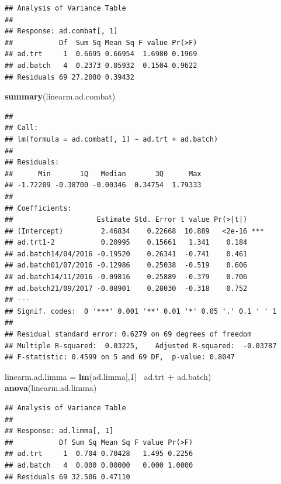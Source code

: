 \documentclass[]{book}
\newenvironment{Shaded}{\begin{snugshade}}{\end{snugshade}}
\newcommand{\KeywordTok}[1]{\textcolor[rgb]{0.13,0.29,0.53}{\textbf{#1}}}
\newcommand{\DecValTok}[1]{\textcolor[rgb]{0.00,0.00,0.81}{#1}}
\newcommand{\StringTok}[1]{\textcolor[rgb]{0.31,0.60,0.02}{#1}}
\newcommand{\OperatorTok}[1]{\textcolor[rgb]{0.81,0.36,0.00}{\textbf{#1}}}
\newcommand{\NormalTok}[1]{#1}
\begin{document}
\begin{verbatim}
## Analysis of Variance Table
## 
## Response: ad.combat[, 1]
##           Df  Sum Sq Mean Sq F value Pr(>F)
## ad.trt     1  0.6695 0.66954  1.6980 0.1969
## ad.batch   4  0.2373 0.05932  0.1504 0.9622
## Residuals 69 27.2080 0.39432
\end{verbatim}

\begin{Shaded}
\begin{Highlighting}[]
\KeywordTok{summary}\NormalTok{(linearm.ad.combat)}
\end{Highlighting}
\end{Shaded}

\begin{verbatim}
## 
## Call:
## lm(formula = ad.combat[, 1] ~ ad.trt + ad.batch)
## 
## Residuals:
##      Min       1Q   Median       3Q      Max 
## -1.72209 -0.38700 -0.00346  0.34754  1.79333 
## 
## Coefficients:
##                    Estimate Std. Error t value Pr(>|t|)    
## (Intercept)         2.46834    0.22668  10.889   <2e-16 ***
## ad.trt1-2           0.20995    0.15661   1.341    0.184    
## ad.batch14/04/2016 -0.19520    0.26341  -0.741    0.461    
## ad.batch01/07/2016 -0.12986    0.25038  -0.519    0.606    
## ad.batch14/11/2016 -0.09816    0.25889  -0.379    0.706    
## ad.batch21/09/2017 -0.08901    0.28030  -0.318    0.752    
## ---
## Signif. codes:  0 '***' 0.001 '**' 0.01 '*' 0.05 '.' 0.1 ' ' 1
## 
## Residual standard error: 0.6279 on 69 degrees of freedom
## Multiple R-squared:  0.03225,    Adjusted R-squared:  -0.03787 
## F-statistic: 0.4599 on 5 and 69 DF,  p-value: 0.8047
\end{verbatim}

\begin{Shaded}
\begin{Highlighting}[]
\NormalTok{linearm.ad.limma =}\StringTok{ }\KeywordTok{lm}\NormalTok{(ad.limma[,}\DecValTok{1}\NormalTok{]}\OperatorTok{~}\StringTok{ }\NormalTok{ad.trt }\OperatorTok{+}\StringTok{ }\NormalTok{ad.batch)}
\KeywordTok{anova}\NormalTok{(linearm.ad.limma)}
\end{Highlighting}
\end{Shaded}

\begin{verbatim}
## Analysis of Variance Table
## 
## Response: ad.limma[, 1]
##           Df Sum Sq Mean Sq F value Pr(>F)
## ad.trt     1  0.704 0.70428   1.495 0.2256
## ad.batch   4  0.000 0.00000   0.000 1.0000
## Residuals 69 32.506 0.47110
\end{verbatim}
\end{document}
